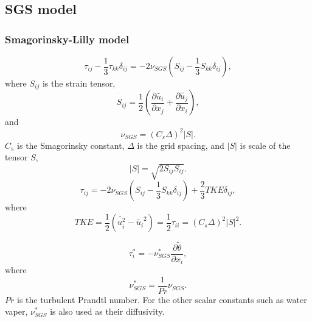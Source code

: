\subsection{SGS model}
\subsubsection{Smagorinsky-Lilly model}
\begin{equation}
  \tau_{ij} - \frac{1}{3}\tau_{kk}\delta_{ij} = -2\nu_{SGS}\left(S_{ij}-\frac{1}{3}S_{kk}\delta_{ij}\right),
\end{equation}
where $S_{ij}$ is the strain tensor,
\begin{equation}
  S_{ij} = \frac{1}{2}\left(\frac{\partial \widetilde{u_i}}{\partial x_j} + \frac{\partial \widetilde{u_j}}{\partial x_i}\right),
  \label{eq:strain tensor}
\end{equation}
and
\begin{equation}
  \nu_{SGS} = \left(C_s\Delta\right)^2 \left|S\right|.
\end{equation}
$C_s$ is the Smagorinsky constant,
$\Delta$ is the grid spacing,
and $\left|S\right|$ is scale of the tensor $S$,
\begin{equation}
  \left|S\right| = \sqrt{2S_{ij}S_{ij}}.
  \label{eq:|S|}
\end{equation}
\begin{equation}
  \tau_{ij} = -2\nu_{SGS}\left(S_{ij}-\frac{1}{3}S_{kk}\delta_{ij}\right)
             + \frac{2}{3} TKE\delta_{ij},
  \label{eq:tau}
\end{equation}
where
\begin{equation}
  TKE = \frac{1}{2}\left(\widetilde{u_i^2} - \widetilde{u_i}^2\right)
   = \frac{1}{2}\tau_{ii}
   = \left(C_s\Delta\right)^2\left|S\right|^2.
   \label{eq:tke}
\end{equation}


\begin{equation}
  \tau^*_i = -\nu^*_{SGS} \frac{\partial \widetilde{\theta}}{\partial x_i},
  \label{eq:tau*}
\end{equation}
where
\begin{equation}
  \nu^*_{SGS} = \frac{1}{Pr}\nu_{SGS}.
\end{equation}
$Pr$ is the turbulent Prandtl number.
For the other scalar constants such as water vaper,
$\nu^*_{SGS}$ is also used as their diffusivity.

